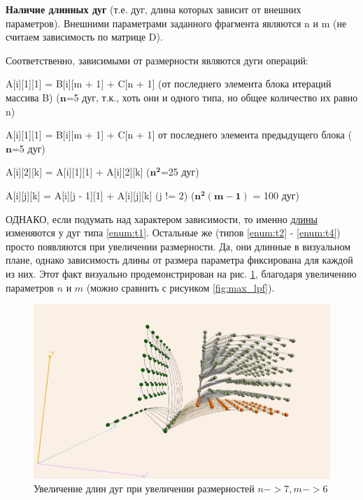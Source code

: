 \documentclass[12pt, fleqn]{article}
\theoremstyle{definition}
\newenvironment{packed_enum}{
\begin{enumerate}
  \setlength{\itemsep}{1pt}
  \setlength{\parskip}{0pt}
  \setlength{\parsep}{0pt}
}{\end{enumerate}}
\begin{document}
\begin{packed_enum}
 \item \textbf{Наличие длинных дуг} (т.е. дуг, длина которых зависит от внешних параметров). Внешними параметрами заданного фрагмента являются n и m (не считаем зависимость по матрице D).
 
 Соответственно, зависимыми от размерности являются дуги операций:
 \begin{packed_enum}
  \item \label{enum:t1} A[i][1][1] = B[i][m + 1] + C[n + 1] (от последнего элемента блока итераций массива B) ($\mathbf{n}$=5 дуг, т.к., хоть они и одного типа, но общее количество их равно n)
  \item \label{enum:t2} A[i][1][1] = B[i][m + 1] + C[n + 1] от последнего элемента предыдущего блока ($\mathbf{n}$=5 дуг)
  \item \label{enum:t3} A[i][2][k] = A[i][1][1] + A[i][2][k] ($\mathbf{n^2}$=25 дуг)
  \item \label{enum:t4} A[i][j][k] = A[i][j - 1][1] + A[i][j][k] (j != 2) ($\mathbf{n^2 (m - 1)}$ = 100 дуг)
 \end{packed_enum}
 
ОДНАКО, если подумать над характером зависимости, то именно \underline{длины} изменяются у дуг типа \ref{enum:t1}. Остальные же (типов \ref{enum:t2} - \ref{enum:t4}) просто появляются при увеличении размерности. Да, они длинные в визуальном плане, однако зависимость длины от размера параметра фиксирована для каждой из них. Этот факт визуально продемонстрирован на рис. \ref{fig:length}, благодаря увеличению параметров $n$ и $m$ (можно сравнить с рисунком \ref{fig:max_lpf}).
 \begin{figure}[ht]
\begin{center}
 \includegraphics[scale=0.96]{lengths.png}
 \caption{Увеличение длин дуг при увеличении размерностей $n->7, m->6$}
 \label{fig:length}
\end{center}
\end{figure}


\end{packed_enum}
\end{document}
